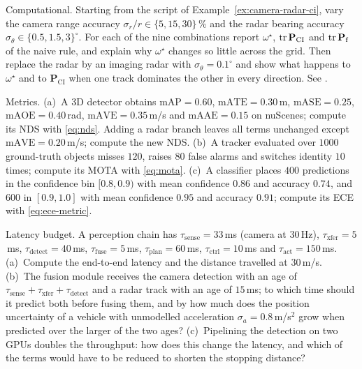 \begin{prob}\label{prob:ch05:6}
Computational. Starting from the script of Example~\ref{ex:camera-radar-ci}, vary the camera range accuracy $\sigma_{r}/r\in\{5,15,30\}$\,\% and the radar bearing accuracy $\sigma_{\theta}\in\{0.5,1.5,3\}^{\circ}$. For each of the nine combinations report $\omega^{\star}$, $\operatorname{tr}\mathbf{P}_{\mathrm{CI}}$ and $\operatorname{tr}\mathbf{P}_{\mathrm{f}}$ of the naive rule, and explain why $\omega^{\star}$ changes so little across the grid. Then replace the radar by an imaging radar with $\sigma_{\theta}=0.1^{\circ}$ and show what happens to $\omega^{\star}$ and to $\mathbf{P}_{\mathrm{CI}}$ when one track dominates the other in every direction. See .
\end{prob}

\begin{prob}\label{prob:ch05:7}
Metrics. (a)~A 3D detector obtains $\mathrm{mAP}=0.60$, $\mathrm{mATE}=0.30$\,m, $\mathrm{mASE}=0.25$, $\mathrm{mAOE}=0.40$\,rad, $\mathrm{mAVE}=0.35$\,m/s and $\mathrm{mAAE}=0.15$ on nuScenes; compute its NDS with \eqref{eq:nds}. Adding a radar branch leaves all terms unchanged except $\mathrm{mAVE}=0.20$\,m/s; compute the new NDS. (b)~A tracker evaluated over $1000$ ground-truth objects misses $120$, raises $80$ false alarms and switches identity $10$ times; compute its MOTA with \eqref{eq:mota}. (c)~A classifier places $400$ predictions in the confidence bin $[0.8,0.9)$ with mean confidence $0.86$ and accuracy $0.74$, and $600$ in $[0.9,1.0]$ with mean confidence $0.95$ and accuracy $0.91$; compute its ECE with \eqref{eq:ece-metric}.
\end{prob}

\begin{prob}\label{prob:ch05:8}
Latency budget. A perception chain has $\tau_{\mathrm{sense}}=33$\,ms (camera at $30$\,Hz), $\tau_{\mathrm{xfer}}=5$\,ms, $\tau_{\mathrm{detect}}=40$\,ms, $\tau_{\mathrm{fuse}}=5$\,ms, $\tau_{\mathrm{plan}}=60$\,ms, $\tau_{\mathrm{ctrl}}=10$\,ms and $\tau_{\mathrm{act}}=150$\,ms. (a)~Compute the end-to-end latency and the distance travelled at $30$\,m/s. (b)~The fusion module receives the camera detection with an age of $\tau_{\mathrm{sense}}+\tau_{\mathrm{xfer}}+\tau_{\mathrm{detect}}$ and a radar track with an age of $15$\,ms; to which time should it predict both before fusing them, and by how much does the position uncertainty of a vehicle with unmodelled acceleration $\sigma_{a}=0.8$\,m/s$^{2}$ grow when predicted over the larger of the two ages? (c)~Pipelining the detection on two GPUs doubles the throughput: how does this change the latency, and which of the terms would have to be reduced to shorten the stopping distance?
\end{prob}

